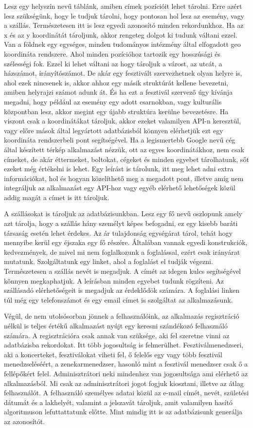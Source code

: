 Lesz egy helyszín nevű táblánk, amiben címek pozícióit lehet tárolni. Erre azért lesz szükségünk, hogy le tudjuk tárolni, hogy pontosan hol lesz az esemény, vagy a szállás. Természetesen itt is lesz egyedi azonosító minden rekordunkhoz. Ha az x és az y koordinátát tároljunk, akkor rengeteg dolgot ki tudunk váltani ezzel. Van a földnek egy egységes, minden tudományos intézmény által elfogadott geo koordináta rendszere. Ahol minden pozícióhoz tartozik egy hosszúsági és szélességi fok. Ezzel ki lehet váltani az hogy tároljuk a várost, az utcát, a házszámot, irányítószámot. De akár egy fesztivált szervezhetnek olyan helyre is, ahol ezek nincsenek is, akkor ahhoz egy másik struktúrát kellene bevezetni, amiben helyrajzi számot adunk át. És ha ezt a fesztivál szervező úgy kívánja megadni, hogy például az esemény egy adott csarnokban, vagy kulturális központban lesz, akkor megint egy újabb struktúra kerülne bevezetésre. Ha viszont csak a koordinátákat tároljuk, akkor ezeket valamilyen API-n keresztül, vagy előre mások által legyártott adatbázisból könnyen elérhetjük ezt egy koordináta rendszerbeli pont segítségével. Ha a legismertebb Google nevű cég által készített térkép alkalmazást nézzük, ott az egyes koordinátákhoz, nem csak címeket, de akár éttermeket, boltokat, cégeket és minden egyebet tárolhatunk, sőt ezeket még értékelni is lehet. Egy leírást is tárolunk, itt meg lehet adni extra információkat, hol és hogyan közelíthető meg a megadott pont, illetve amíg nem integráljuk az alkalmazást egy API-hoz vagy egyéb elérhető lehetőségek közül addig magát a címet is itt tároljuk.

A szállásokat is tároljuk az adatbázisunkban. Lesz egy fő nevű oszlopunk amely azt tárolja, hogy a szállás hány személyt képes befogadni, ez egy kisebb baráti társaság esetén lehet érdekes. Az ár tulajdonság egységárat tárol, tehát hogy mennyibe kerül egy éjszaka egy fő részére. Általában vannak egyedi konstrukciók, kedvezmények, de mivel mi nem foglalkozunk a foglalással, ezért csak irányárat mutatunk. Szolgáltatunk egy linket, ahol a foglalást el tudják végezni. Természetesen a szállás nevét is megadjuk. A címét az idegen kulcs segítségével könnyen megkaphatjuk. A leírásban minden egyebet tudunk rögzíteni. Az szállásadó elérhetőségeit is megadjuk az érdeklődök számára. A foglalási linken túl még egy telefonszámot és egy email címet is szolgáltat az alkalmazásunk.

Végül, de nem utolsósorban jönnek a felhasználóink, az alkalmazás regisztráció nélkül is teljes értékű alkalmazást nyújt egy keresni szándékozó felhasználó számára. A regisztrációra csak annak van szüksége, aki fel szeretne vinni az adatbázisba rekordokat. Itt több jogosultság is  felmerülhet. Fesztiválmenedzseri, aki a koncerteket, fesztiválokat viheti fel, ő felelős egy vagy több fesztivál menedzseléséért, a zenekarmenedzser, hasonló mint a fesztivál menedzser csak ő a fellépőkért felel. Adminisztrátori neki mindenhez van jogosultsága ami elérhető az alkalmazásból. Mi csak az adminisztrátori jogot fogjuk kiosztani, illetve az átlag felhasználót. A felhasználó személyes adatai közül az e-mail címét, nevét, születési dátumát és a lakhelyét, valamint a jelszavát tároljuk, amit valamilyen hasító algoritmuson lefuttattatunk előtte. Mint mindig itt is az adatbázisunk generálja az azonosítót.


